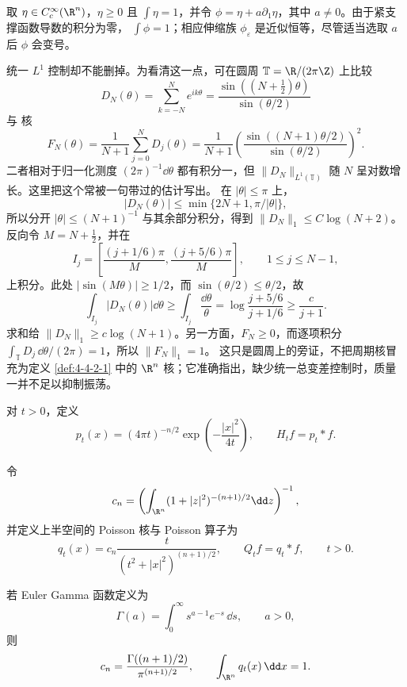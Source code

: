 \begin{example}[正性不是定义的一部分]\label{ex:4-4-2-1}
取 $\eta\in C_c^\infty(\R^n)$，$\eta\ge0$ 且 $\int\eta=1$，并令
$\phi=\eta+a\partial_1\eta$，其中 $a\ne0$。由于紧支撑函数导数的积分为零，
$\int\phi=1$；相应伸缩族 $\phi_\varepsilon$ 是近似恒等，尽管适当选取 $a$ 后 $\phi$ 会变号。

统一 $L^1$ 控制却不能删掉。为看清这一点，可在圆周 $\mathbb T=\R/(2\pi\Z)$ 上比较
\[
 D_N(\theta)=\sum_{k=-N}^Ne^{ik\theta}
 =\frac{\sin((N+\tfrac12)\theta)}{\sin(\theta/2)}
\]
与 \Fejer{} 核
\[
 F_N(\theta)=\frac1{N+1}\sum_{j=0}^ND_j(\theta)
 =\frac1{N+1}
 \left(\frac{\sin((N+1)\theta/2)}{\sin(\theta/2)}\right)^2.
\]
二者相对于归一化测度 $(2\pi)^{-1}\dd\theta$ 都有积分一，但
$\|D_N\|_{L^1(\mathbb T)}$ 随 $N$ 呈对数增长。这里把这个常被一句带过的估计写出。
在 $|\theta|\le\pi$ 上，
\[
 |D_N(\theta)|\le
 \min\{2N+1,\pi/|\theta|\},
\]
所以分开 $|\theta|\le(N+1)^{-1}$ 与其余部分积分，得到
$\|D_N\|_1\le C\log(N+2)$。反向令 $M=N+\tfrac12$，并在
\[
 I_j=\left[\frac{(j+1/6)\pi}{M},
             \frac{(j+5/6)\pi}{M}\right],
 \qquad 1\le j\le N-1,
\]
上积分。此处 $|\sin(M\theta)|\ge1/2$，而
$\sin(\theta/2)\le\theta/2$，故
\[
 \int_{I_j}|D_N(\theta)|\dd\theta
 \ge\int_{I_j}\frac{\dd\theta}{\theta}
 =\log\frac{j+5/6}{j+1/6}\ge\frac{c}{j+1}.
\]
求和给 $\|D_N\|_1\ge c\log(N+1)$。另一方面，$F_N\ge0$，而逐项积分
$\int_{\mathbb T}D_j\,\dd\theta/(2\pi)=1$，所以 $\|F_N\|_1=1$。
这只是圆周上的旁证，不把周期核冒充为定义
\ref{def:4-4-2-1} 中的 $\R^n$ 核；它准确指出，缺少统一总变差控制时，质量一并不足以抑制振荡。
\end{example}

\begin{definition}[热核]\label{def:4-4-2-2}
对 $t>0$，定义
\[
 p_t(x)=(4\pi t)^{-n/2}\exp\!\left(-\frac{|x|^2}{4t}\right),
 \qquad H_tf=p_t*f.
\]
\end{definition}

\begin{definition}[Poisson 核]\label{def:4-4-2-3}
令
\[
c_n=\left(\int_{\R^n}(1+|z|^2)^{-(n+1)/2}\dd z\right)^{-1},
\]
并定义上半空间的 Poisson 核与 Poisson 算子为
\[
 q_t(x)=c_n\frac{t}{(t^2+|x|^2)^{(n+1)/2}},
 \qquad Q_tf=q_t*f,\qquad t>0.
\]
\end{definition}

\begin{proposition}
若 Euler Gamma 函数定义为
\[
 \Gamma(a)=\int_0^\infty s^{a-1}e^{-s}\,\dd s,
 \qquad a>0,
\]
则
\[
 c_n=\frac{\Gamma((n+1)/2)}{\pi^{(n+1)/2}},
 \qquad \int_{\R^n}q_t(x)\,\dd x=1.
\]
\end{proposition}


